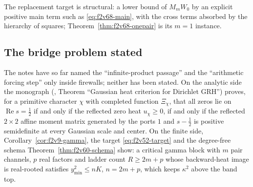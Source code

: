 \documentclass[11pt]{article}
\theoremstyle{definition}
\theoremstyle{remark}
\begin{document}
The replacement target is structural: a lower bound of \(M_mW_0\) by an
explicit positive main term such as \eqref{eq:f2v68-main}, with the cross
terms absorbed by the hierarchy of squares; Theorem~\ref{thm:f2v68-onepair}
is its \(m=1\) instance.

\subsection{The bridge problem stated}

The notes have so far named the ``infinite-product passage'' and the
``arithmetic forcing step'' only inside firewalls; neither has been
stated.  On the analytic side the monograph
(, Theorem
``Gaussian heat criterion for Dirichlet GRH'') proves, for a primitive
character \(\chi\) with completed function \(\Xi_\chi\), that all zeros
lie on \(\operatorname{Re}s=\tfrac12\) if and only if the reflected zero
heat \(u_\chi\ge0\), if and only if the reflected \(2\times2\) affine
moment matrix generated by the ports \(1\) and \(s-\tfrac12\) is positive
semidefinite at every Gaussian scale and center.  On the finite side,
Corollary~\ref{cor:f2v9-gamma}, the target \eqref{eq:f2v52-target} and the
degree-free schema Theorem~\ref{thm:f2v60-schema} show: a critical gamma
block with \(m\) pair channels, \(p\) real factors and ladder count
\(R\ge2m+p\) whose backward-heat image is real-rooted satisfies
\(y_{\min}^2\le nK\), \(n=2m+p\), which keeps \(\kappa^2\) above the band
top.
\end{document}
